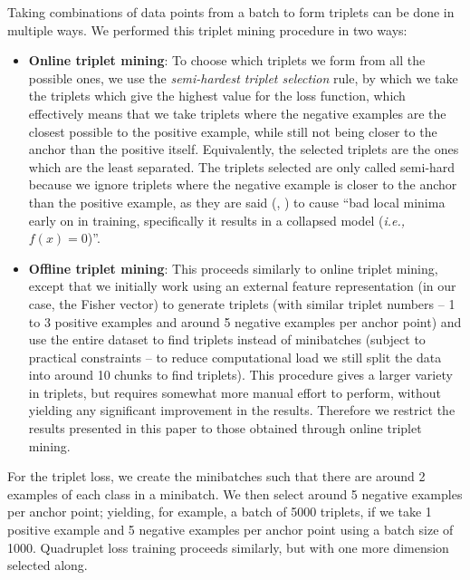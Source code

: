 \documentclass[10pt,twocolumn,letterpaper]{article}
\begin{document}
        Taking combinations of data points from a batch to form triplets can be done in multiple ways. We performed this triplet mining procedure in two ways:
            \begin{itemize}
            	\item \textbf{Online triplet mining}: To choose which triplets we form from all the possible ones, we use the \emph{semi-hardest triplet selection} rule, by which we take the triplets which give the highest value for the loss function, which effectively means that we take triplets where the negative examples are the closest possible to the positive example, while still not being closer to the anchor than the positive itself. Equivalently, the selected triplets are the ones which are the least separated. The triplets selected are only called semi-hard because we ignore triplets where the negative example is closer to the anchor than the positive example, as they are said (\cite{SchroffEtAl15}, \cite{hermans2017defense}) to cause ``bad local minima early on in training, specifically it results in a collapsed model (\emph{i.e., $f(x) = 0$})''.
            	
            	\item \textbf{Offline triplet mining}: This proceeds similarly to online triplet mining, except that we initially work using an external feature representation (in our case, the Fisher vector) to generate triplets (with similar triplet numbers -- 1 to 3 positive examples and around 5 negative examples per anchor point) and use the entire dataset to find triplets instead of minibatches (subject to practical constraints -- to reduce computational load we still split the data into around 10 chunks to find triplets). This procedure gives a larger variety in triplets, but requires somewhat more manual effort to perform, without yielding any significant improvement in the results. Therefore we restrict the results presented in this paper to those obtained through online triplet mining.
            \end{itemize}
        
        For the triplet loss, we create the minibatches such that there are around 2 examples of each class in a minibatch. We then select around 5 negative examples per anchor point; yielding, for example, a batch of 5000 triplets, if we take 1 positive example and 5 negative examples per anchor point using a batch size of 1000. Quadruplet loss training proceeds similarly, but with one more dimension selected along.
    
\end{document}
